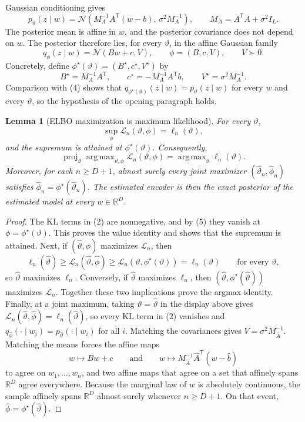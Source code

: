 \documentclass[11pt]{article}
\DeclareMathOperator*{\argmaxop}{arg\,max}
\DeclareMathOperator{\proj}{proj}
\newcommand{\R}{\mathbb{R}}
\newcommand{\N}{\mathcal{N}}
\newcommand{\trans}{\mathsf{T}}
\newtheorem{lemma}{Lemma}
\theoremstyle{remark}
\begin{document}
Gaussian conditioning gives
\begin{equation}
p_\vartheta(z\mid w)
=
\N\!\left(M_A^{-1}A^\trans(w-b),\,\sigma^2M_A^{-1}\right),
\qquad
M_A=A^\trans A+\sigma^2I_L.
\tag{4}
\end{equation}
The posterior mean is affine in $w$, and the posterior covariance does not depend on $w$. The posterior therefore lies, for every $\vartheta$, in the affine Gaussian family
\[
q_\phi(z\mid w)=\N(Bw+c,V),
\qquad
\phi=(B,c,V),
\qquad
V\succ0.
\]
Concretely, define $\phi^\star(\vartheta)=(B^\star,c^\star,V^\star)$ by
\begin{equation}
B^\star=M_A^{-1}A^\trans,
\qquad
c^\star=-M_A^{-1}A^\trans b,
\qquad
V^\star=\sigma^2M_A^{-1}.
\tag{5}
\end{equation}
Comparison with (4) shows that
$q_{\phi^\star(\vartheta)}(z\mid w)=p_\vartheta(z\mid w)$ for every $w$ and every $\vartheta$, so the hypothesis of the opening paragraph holds.

\begin{lemma}[ELBO maximization is maximum likelihood]
For every $\vartheta$,
\[
\sup_\phi\mathcal{L}_n(\vartheta,\phi)=\ell_n(\vartheta),
\]
and the supremum is attained at $\phi^\star(\vartheta)$. Consequently,
\[
\proj_\vartheta\argmaxop_{\vartheta,\phi}\mathcal{L}_n(\vartheta,\phi)
=
\argmaxop_\vartheta\ell_n(\vartheta).
\]
Moreover, for each $n\geq D+1$, almost surely every joint maximizer
$(\widehat\vartheta_n,\widehat\phi_n)$ satisfies
$\widehat\phi_n=\phi^\star(\widehat\vartheta_n)$. The estimated encoder is then the exact posterior of the estimated model at every $w\in\R^D$.
\end{lemma}

\begin{proof}
The KL terms in (2) are nonnegative, and by (5) they vanish at
$\phi=\phi^\star(\vartheta)$. This proves the value identity and shows that the supremum is attained. Next, if $(\widehat\vartheta,\widehat\phi)$ maximizes $\mathcal{L}_n$, then
\[
\ell_n(\widehat\vartheta)
\geq
\mathcal{L}_n(\widehat\vartheta,\widehat\phi)
\geq
\mathcal{L}_n\!\left(\vartheta,\phi^\star(\vartheta)\right)
=
\ell_n(\vartheta)
\qquad\text{for every }\vartheta,
\]
so $\widehat\vartheta$ maximizes $\ell_n$. Conversely, if $\widehat\vartheta$ maximizes $\ell_n$, then
$(\widehat\vartheta,\phi^\star(\widehat\vartheta))$ maximizes $\mathcal{L}_n$. Together these two implications prove the argmax identity. Finally, at a joint maximum, taking $\vartheta=\widehat\vartheta$ in the display above gives
$\mathcal{L}_n(\widehat\vartheta,\widehat\phi)=\ell_n(\widehat\vartheta)$, so every KL term in (2) vanishes and
$q_{\widehat\phi}(\cdot\mid w_i)=p_{\widehat\vartheta}(\cdot\mid w_i)$ for all $i$. Matching the covariances gives
$V=\sigma^2M_{\widehat A}^{-1}$. Matching the means forces the affine maps
\[
w\longmapsto Bw+c
\qquad\text{and}\qquad
w\longmapsto M_{\widehat A}^{-1}\widehat A^\trans(w-\widehat b)
\]
to agree on $w_1,\ldots,w_n$, and two affine maps that agree on a set that affinely spans $\R^D$ agree everywhere. Because the marginal law of $w$ is absolutely continuous, the sample affinely spans $\R^D$ almost surely whenever $n\geq D+1$. On that event,
$\widehat\phi=\phi^\star(\widehat\vartheta)$.
\end{proof}
\end{document}
